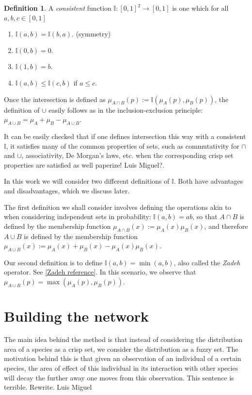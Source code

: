\documentclass[12pt]{article}
\numberwithin{equation}{section} %
\numberwithin{figure}{section} %
\def\II{{\mathbb{I}}}
\theoremstyle{definition}
\newtheorem{definition}[theorem]{Definition}
\def\tcr#1{\textcolor{MyRed}{#1}}
\begin{document}
\begin{definition}
A \emph{consistent} function $\II : [0,1]^2 \to [0,1]$ is one which for all $a,b,c\in[0,1]$
\begin{enumerate}
  \item $\II(a,b) = \II(b,a)$. (symmetry)
  \item $\II(0,b) = 0$.
  \item $\II(1,b) = b$.
  \item $\II(a,b) \leq \II(c,b)$ if $a \leq c$.
\end{enumerate}
\end{definition}

Once the intersection is defined as $\mu_{A\cap B}(p) := \II(\mu_A(p),\mu_B(p))$, the definition of $\cup$ easily follows as in the inclusion-exclusion principle: $\mu_{A\cup B} = \mu_A + \mu_B - \mu_{A\cup B}$.

It can be easily checked that if one defines intersection this way with a consistent $\II$, it satisfies many of the common properties of sets, such as commutativity for $\cap$ and $\cup$, associativity, De Morgan's laws, etc. when the corresponding crisp set properties are satisfied as well \tcr{paperize! Luis Miguel?}.



In this work we will consider two different definitions of $\II$. Both have advantages and disadvantages, which we discuss later.

The first definition we shall consider involves defining the operations akin to when considering independent sets in probability: $\II(a,b) = ab$, so that $A\cap B$ is defined by the membership function $\mu_{A\cap B} (x) := \mu_A(x)\mu_B(x)$, and therefore $A\cup B$ is defined by the membership function $\mu_{A\cup B} (x) := \mu_A(x)+\mu_B(x)-\mu_A(x)\mu_B(x)$.

Our second definition is to define $\II(a,b) = \min(a,b)$, also called the \emph{Zadeh} operator. See \tcr{\ref{Zadeh reference}}. In this scenario, we observe that $\mu_{A\cup B}(p) = \max(\mu_A(p),\mu_B(p))$.

\section{Building the network}

The main idea behind the method is that instead of considering the distribution area of a species as a crisp set, we consider the distribution as a fuzzy set. The motivation behind this is that given an observation of an individual of a certain species, the area of effect of this individual in its interaction with other species will decay the further away one moves from this observation. \tcr{This sentence is terrible. Rewrite. \tcr{Luis Miguel}}
\end{document}
